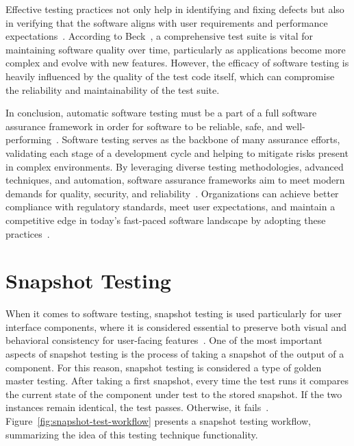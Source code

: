 \documentclass[
	msc, %
	english %
]{../ppgccufmg}
\begin{document}
    Effective testing practices not only help in identifying and fixing defects but also in verifying that the software aligns with user requirements and performance expectations~\cite{ISO29119-1}. According to Beck~\cite{beck2003}, a comprehensive test suite is vital for maintaining software quality over time, particularly as applications become more complex and evolve with new features. However, the efficacy of software testing is heavily influenced by the quality of the test code itself, which can compromise the reliability and maintainability of the test suite.

    In conclusion, automatic software testing must be a part of a full software assurance framework in order for software to be reliable, safe, and well-performing~\cite{humble2010, martin2020}. Software testing serves as the backbone of many assurance efforts, validating each stage of a development cycle and helping to mitigate risks present in complex environments. By leveraging diverse testing methodologies, advanced techniques, and automation, software assurance frameworks aim to meet modern demands for quality, security, and reliability~\cite{IEEE1012-2016}. Organizations can achieve better compliance with regulatory standards, meet user expectations, and maintain a competitive edge in today's fast-paced software landscape by adopting these practices~\cite{Bass2015}.

    \section{Snapshot Testing}\label{sec:ch2-snapshot-testing}

    When it comes to software testing, snapshot testing is used particularly for user interface components, where it is considered essential to preserve both visual and behavioral consistency for user-facing features~\cite{fernandes2019}. One of the most important aspects of snapshot testing is the process of taking a snapshot of the output of a component. For this reason, snapshot testing is considered a type of golden master testing. After taking a first snapshot, every time the test runs it compares the current state of the component under test to the stored snapshot. If the two instances remain identical, the test passes. Otherwise, it fails~\cite{Jest22}. Figure~\ref{fig:snapshot-test-workflow} presents a snapshot testing workflow, summarizing the idea of this testing technique functionality.
\end{document}
